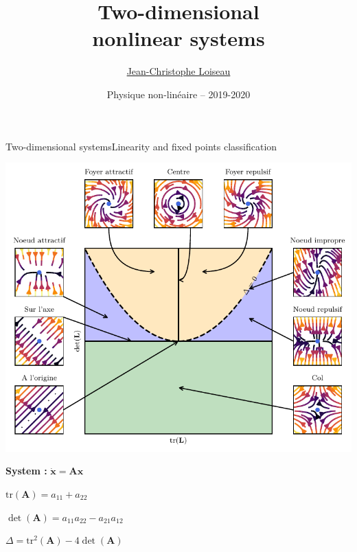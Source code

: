 \documentclass[usenames,dvipsnames,svgnames,10pt,aspectratio=169]{beamer}
\title[Nonlinear physics] %
{
	Two-dimensional \\ nonlinear systems
}
\author[J.-Ch.~Loiseau] %
{
	\underline{Jean-Christophe Loiseau}
}
\institute[unused]
{
	\url{jean-christophe.loiseau@ensam.eu} \\
	Laboratoire DynFluid \\
	Arts et M\'etiers, France.
}
\date[unused]{Physique non-lin\'eaire -- 2019-2020}
\begin{document}
\titleframe	%


\begin{frame}[t, c]{Two-dimensional systems}{Linearity and fixed points classification}
  \begin{minipage}{.68\textwidth}
    \centering
    \includegraphics[height=.75\textheight]{fixed_points_classification}
  \end{minipage}%
  \hfill
  \begin{minipage}{.28\textwidth}
    \centering

    \textbf{System :} $\dot{\bm{x}} = \bm{Ax}$

    \bigskip

    \( \text{tr}(\bm{A}) = a_{11} + a_{22} \)

    \bigskip

    \( \det(\bm{A}) = a_{11} a_{22} - a_{21} a_{12} \)

    \bigskip

    \( \Delta = \text{tr}^2(\bm{A}) - 4 \det(\bm{A}) \)
    
  \end{minipage}

  \vspace{1cm}
\end{frame}
\end{document}
